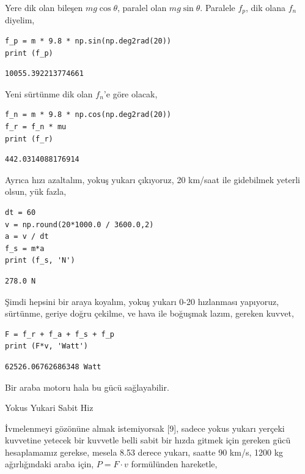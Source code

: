 \documentclass[12pt,fleqn]{article}\usepackage{../../common}
\begin{document}
Yere dik olan bileşen $m g \cos\theta$, paralel olan $m g \sin\theta$. Paralele
$f_p$, dik olana $f_n$ diyelim,

\begin{verbatim}  
f_p = m * 9.8 * np.sin(np.deg2rad(20))
print (f_p)
\end{verbatim}

\begin{verbatim}
10055.392213774661
\end{verbatim}

Yeni sürtünme dik olan $f_n$'e göre olacak,

\begin{verbatim}
f_n = m * 9.8 * np.cos(np.deg2rad(20))
f_r = f_n * mu
print (f_r)
\end{verbatim}

\begin{verbatim}
442.0314088176914
\end{verbatim}

Ayrıca hızı azaltalım, yokuş yukarı çıkıyoruz, 20 km/saat ile gidebilmek yeterli
olsun, yük fazla,

\begin{verbatim}
dt = 60
v = np.round(20*1000.0 / 3600.0,2)
a = v / dt
f_s = m*a
print (f_s, 'N')
\end{verbatim}

\begin{verbatim}
278.0 N
\end{verbatim}

Şimdi hepsini bir araya koyalım, yokuş yukarı 0-20 hızlanması yapıyoruz,
sürtünme, geriye doğru çekilme, ve hava ile boğuşmak lazım, gereken kuvvet,

\begin{verbatim}  
F = f_r + f_a + f_s + f_p
print (F*v, 'Watt')
\end{verbatim}

\begin{verbatim}
62526.06762686348 Watt
\end{verbatim}

Bir araba motoru hala bu gücü sağlayabilir.

Yokus Yukari Sabit Hiz

İvmelenmeyi gözönüne almak istemiyorsak [9], sadece yokus yukarı yerçeki
kuvvetine yetecek bir kuvvetle belli sabit bir hızda gitmek için gereken gücü
hesaplamamız gerekse, mesela 8.53 derece yukarı, saatte 90 km/s, 1200 kg
ağırlığındaki araba için, $P = F \cdot v$ formülünden hareketle,
\end{document}

